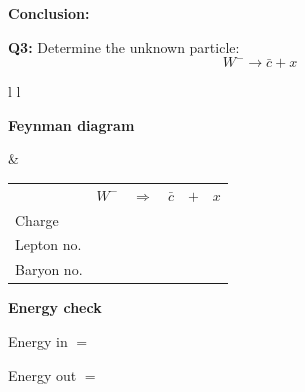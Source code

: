 \documentclass[12pt]{article}
\begin{document}
\vspace{0.5cm}

\textbf{Conclusion:}

\vspace{2.5cm}


\textbf{Q3:} Determine the unknown particle:
\[
W^- \rightarrow \bar{c} + x
\]

\vspace{0.5cm}

\begin{tabular}{l l}

\begin{minipage}[t]{0.46\textwidth}
\vspace{0pt}
\textbf{Feynman diagram}

\vspace{0.6cm}

\begin{tikzpicture}
\begin{feynman}
  \vertex (W) at (0,2) {};
  \vertex [coordinate] (v) at (3,2) {};

  \vertex (cbar) at (4,4) {\(\bar{c}\)};
  \vertex (x)    at (5,3) {\(x\)};

  \diagram*{
    (W) -- [boson, edge label=\(W^-\), momentum'={}] (v),
    (v) -- [fermion] (cbar),
    (v) -- [fermion] (x),
  };
\end{feynman}
\end{tikzpicture}
\end{minipage}
&
\begin{minipage}[t]{0.50\textwidth}
\vspace{0pt}

\renewcommand{\arraystretch}{1.4}
\begin{tabular}{@{}l c c c c c@{}}
 & \(W^-\) & \(\Rightarrow\) & \(\bar{c}\) & \(+\) & \(x\) \\
Charge &  &  &  &  &  \\
Lepton no. &  &  &  &  &  \\
Baryon no. &  &  &  &  &  \\
\end{tabular}

\vspace{0.6cm}

\textbf{Energy check}

Energy in $=$

Energy out $=$

\end{minipage}

\end{tabular}
\end{document}

